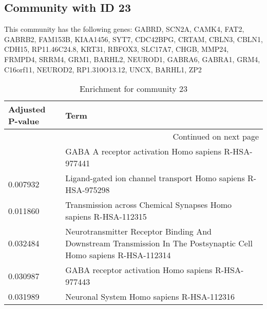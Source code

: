 \subsection*{Community with ID 23}
This community has the following genes: GABRD, SCN2A, CAMK4, FAT2, GABRB2, FAM153B, KIAA1456, SYT7, CDC42BPG, CRTAM, CBLN3, CBLN1, CDH15, RP11.46C24.8, KRT31, RBFOX3, SLC17A7, CHGB, MMP24, FRMPD4, SRRM4, GRM1, BARHL2, NEUROD1, GABRA6, GABRA1, GRM4, C16orf11, NEUROD2, RP1.310O13.12, UNCX, BARHL1, ZP2
\\
\begin{longtable}{p{2.4cm}p{14.5cm}}
\caption{Enrichment for community 23}\\
\toprule
Adjusted \newline P-value &                                                                                                               Term \\
\midrule
\endhead
\midrule
\multicolumn{2}{r}{{Continued on next page}} \\
\midrule
\endfoot

\bottomrule
\endlastfoot
                 0.001771 &                                                               GABA A receptor activation Homo sapiens R-HSA-977441 \\
                 0.007932 &                                                       Ligand-gated ion channel transport Homo sapiens R-HSA-975298 \\
                 0.011860 &                                                    Transmission across Chemical Synapses Homo sapiens R-HSA-112315 \\
                 0.032484 &  Neurotransmitter Receptor Binding And Downstream Transmission In The  Postsynaptic Cell Homo sapiens R-HSA-112314 \\
                 0.030987 &                                                                 GABA receptor activation Homo sapiens R-HSA-977443 \\
                 0.031989 &                                                                          Neuronal System Homo sapiens R-HSA-112316 \\
\end{longtable}


